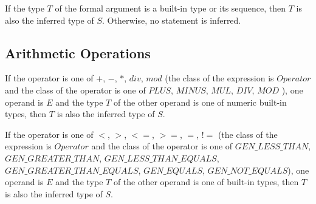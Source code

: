 If the type $T$ of the formal argument is a built-in type or its sequence, then $T$ is also the inferred type of $S$. Otherwise, no statement is inferred.

\subsection{Arithmetic Operations}
If the operator is one of $+$, $-$, $*$, $div$, $mod$ (the class of the expression is $Operator$ and the class of the operator is one of $PLUS$, $MINUS$, $MUL$, $DIV$, $MOD$ ), one operand is $E$ and the type $T$ of the other operand is one of numeric built-in types, then $T$ is also the inferred type of $S$.

If the operator is one of $<$, $>$, $<=$, $>=$, $=$, $!=$ (the class of the expression is $Operator$ and the class of the operator is one of $GEN\_LESS\_THAN$, $GEN\_GREATER\_THAN$, $GEN\_LESS\_THAN\_EQUALS$, $GEN\_GREATER\_THAN\_EQUALS$, $GEN\_EQUALS$, $GEN\_NOT\_EQUALS$), one operand is $E$ and the type $T$ of the other operand is one of built-in types, then $T$ is also the inferred type of $S$.

